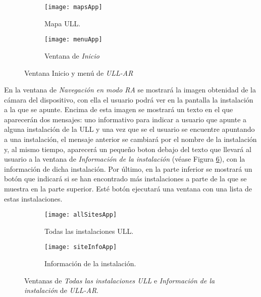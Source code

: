 \begin{figure}[h]
    \hspace*{\fill}%
    \begin{subfigure}[h]{0.37\linewidth}
        \texttt{[image: mapsApp]}
        \caption{Mapa ULL.}
        \label{fig:mapsApp}
    \end{subfigure}
    \hfill%
    \begin{subfigure}[h]{0.37\linewidth}
        \texttt{[image: menuApp]}
        \caption{Ventana de \textit{Inicio}}
        \label{fig:menussApp}
    \end{subfigure}%
    \caption{Ventana Inicio y menú de \textit{ULL-AR}}
    \hspace*{\fill}%
\end{figure}


En la ventana de \textit{Navegación en modo RA} se mostrará la imagen obtenidad de la cámara del dispositivo, con ella el usuario podrá ver en la pantalla la instalación a la que se apunte. Encima de esta imagen se mostrará un texto en el que aparecerán dos mensajes: uno informativo para indicar a usuario que apunte a alguna instalación de la ULL y una vez que se el usuario se encuentre apuntando a una instalación, el mensaje anterior se cambiará por el nombre de la instalación y, al mismo tiempo, aparecerá un pequeño boton debajo del texto que llevará al usuario a la ventana de \textit{Información de la instalación} (véase Figura \ref{fig:siteInfoApp}), con la información de dicha instalación. Por último, en la parte inferior se mostrará un botón que indicará si se han encontrado más instalaciones a parte de la que se muestra en la parte superior. Esté botón ejecutará una ventana con una lista de estas instalaciones.

 
\begin{figure}[h]
    \hspace*{\fill}%
    \begin{subfigure}[h]{0.37\linewidth}
    \texttt{[image: allSitesApp]}
    \caption{Todas las instalaciones ULL.}
    \label{fig:allSitesApp}
    \end{subfigure}
    \hfill%
    \begin{subfigure}[h]{0.37\linewidth}
    \texttt{[image: siteInfoApp]}
    \caption{Información de la instalación.}
    \label{fig:siteInfoApp}
    \end{subfigure}%
    \caption{Ventanas de \textit{Todas las instalaciones ULL} e \textit{Información de la instalación} de \textit{ULL-AR}.}
    \hspace*{\fill}%
\end{figure}

